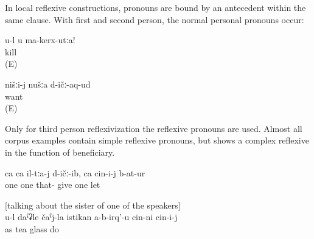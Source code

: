 In local reflexive constructions, pronouns are bound by an antecedent within the same clause. With first and second person, the normal personal pronouns occur:
%
\begin{exe}
	\ex	\label{ex:Do not kill yourself}
	\gll	u-l	u	ma-kerx-utːa!\\
				kill\\
	\glt	{} (E)

	\ex	\label{ex:‎We love us}
	\gll	nišːi-j	nušːa	d-ičː-aq-ud\\
				want\\
	\glt	{} (E) 
\end{exe}

Only for third person reflexivization the reflexive pronouns are used. Almost all corpus examples contain simple reflexive pronouns, but  shows a complex reflexive in the function of beneficiary.
%
\begin{exe}
	\ex	\label{ex:(The boy) gave them one pear each, one he kept for himself@1}
	\gll	ca	ca	il-tːa-j	d-ičː-ib,	ca	cin-i-j	b-at-ur\\
		one	one	that-	give	one		let\\
	\glt	{}

	\ex	\label{ex:She does not make herself a glass of tea like you@10} [talking about the sister of one of the speakers]\\
	\gll	u-l	daˁʡle	čaˁj-la	istikan	a-b-irq'-u	cin-ni cin-i-j\\
			as	tea	glass	do		\\
	\glt	 {}
\end{exe}

